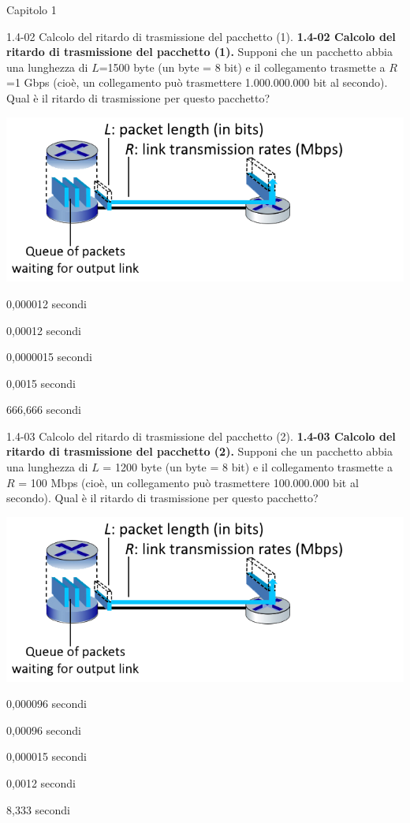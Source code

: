 \documentclass[a4paper]{article}
\begin{document}
\begin{quiz}{Capitolo 1}
\begin{multi}[points=1,shuffle=true]{1.4-02 Calcolo del ritardo di trasmissione del pacchetto (1).}
\textbf{1.4-02 Calcolo del ritardo di trasmissione del pacchetto (1).} 
Supponi che un pacchetto abbia una lunghezza di $L$=1500 byte (un byte = 8 bit) e il collegamento trasmette a $R$=1 Gbps (cioè, un collegamento può trasmettere 1.000.000.000 bit al secondo).  
Qual è il ritardo di trasmissione per questo pacchetto?
\begin{center}
\includegraphics[width=.8\linewidth]{figs/1.4.2.png}
\end{center}
\item* 0,000012 secondi
\item 0,00012 secondi
\item 0,0000015 secondi
\item 0,0015 secondi
\item 666,666 secondi
\end{multi}

\begin{multi}[points=1,shuffle=true]{1.4-03 Calcolo del ritardo di trasmissione del pacchetto (2).}
\textbf{1.4-03 Calcolo del ritardo di trasmissione del pacchetto (2).} 
Supponi che un pacchetto abbia una lunghezza di $L$ = 1200 byte (un byte = 8 bit) e il collegamento trasmette a $R$ = 100 Mbps (cioè, un collegamento può trasmettere 100.000.000 bit al secondo).  Qual è il ritardo di trasmissione per questo pacchetto?
\begin{center}
\includegraphics[width=.8\linewidth]{figs/1.4.2.png}
\end{center}
\item* 0,000096 secondi
\item 0,00096 secondi
\item 0,000015 secondi
\item 0,0012 secondi
\item 8,333 secondi
\end{multi}


\end{quiz}
\end{document}
